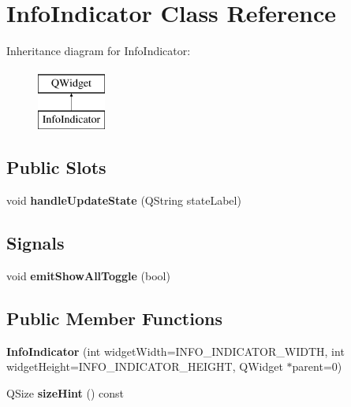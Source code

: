 \hypertarget{class_info_indicator}{\section{Info\+Indicator Class Reference}
\label{class_info_indicator}
}
Inheritance diagram for Info\+Indicator\+:\begin{figure}[H]
\begin{center}
\leavevmode
\includegraphics[height=2.000000cm]{class_info_indicator}
\end{center}
\end{figure}
\subsection*{Public Slots}
\begin{DoxyCompactItemize}
\item 
\hypertarget{class_info_indicator_a838e6276592edd2a99f1d0eaf18fa644}{void {\bfseries handle\+Update\+State} (Q\+String state\+Label)}\label{class_info_indicator_a838e6276592edd2a99f1d0eaf18fa644}

\end{DoxyCompactItemize}
\subsection*{Signals}
\begin{DoxyCompactItemize}
\item 
\hypertarget{class_info_indicator_ab30bb585ee9b7f6b04caa5c6c74884f0}{void {\bfseries emit\+Show\+All\+Toggle} (bool)}\label{class_info_indicator_ab30bb585ee9b7f6b04caa5c6c74884f0}

\end{DoxyCompactItemize}
\subsection*{Public Member Functions}
\begin{DoxyCompactItemize}
\item 
\hypertarget{class_info_indicator_a1af35cc55ceeff12184ccf0e9c7d7d1a}{{\bfseries Info\+Indicator} (int widget\+Width=I\+N\+F\+O\+\_\+\+I\+N\+D\+I\+C\+A\+T\+O\+R\+\_\+\+W\+I\+D\+T\+H, int widget\+Height=I\+N\+F\+O\+\_\+\+I\+N\+D\+I\+C\+A\+T\+O\+R\+\_\+\+H\+E\+I\+G\+H\+T, Q\+Widget $\ast$parent=0)}\label{class_info_indicator_a1af35cc55ceeff12184ccf0e9c7d7d1a}

\item 
\hypertarget{class_info_indicator_ac37c8131840d05ea53d62daaf314d48c}{Q\+Size {\bfseries size\+Hint} () const }\label{class_info_indicator_ac37c8131840d05ea53d62daaf314d48c}

\end{DoxyCompactItemize}
